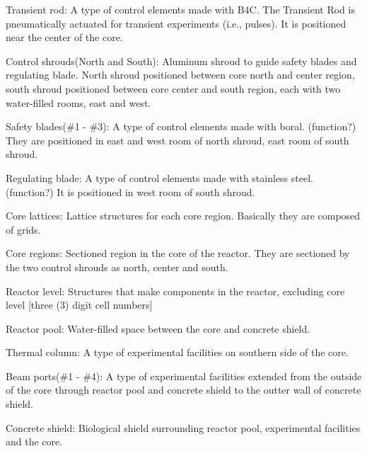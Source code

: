 \documentclass{UWNR_modeling}
\begin{document}
\begin{myenumerate}
	\begin{myitemize}
	\item Transient rod: A type of control elements made with B4C. The Transient Rod is pneumatically actuated for transient experiments (i.e., pulses). It is positioned near the center of the core.
	\item Control shrouds(North and South): Aluminum shroud to guide safety blades and regulating blade. North shroud positioned between core north and center region, south shroud positioned between core center and south region, each with two water-filled rooms, east and west.
	\item Safety blades(\#1 - \#3): A type of control elements made with boral. (function?) They are positioned in east and west room of north shroud, east room of south shroud.
	\item Regulating blade: A type of control elements made with stainless steel. (function?) It is positioned in west room of south shroud.
	\item Core lattices: Lattice structures for each core region. Basically they are composed of grids.
	\item Core regions: Sectioned region in the core of the reactor. They are sectioned by the two control shrouds as north, center and south.
	\end{myitemize}
\item Reactor level: Structures that make components in the reactor, excluding core level [three (3) digit cell numbers]

	\begin{myitemize}
	\item Reactor pool: Water-filled space between the core and concrete shield.
	\item Thermal column: A type of experimental facilities on southern side of the core.
	\item Beam ports(\#1 - \#4): A type of experimental facilities extended from the outside of the core through reactor pool and concrete shield to the outter wall of concrete shield.
	\item Concrete shield: Biological shield surrounding reactor pool, experimental facilities and the core.
\end{myitemize}
\end{myenumerate}
\end{document}
